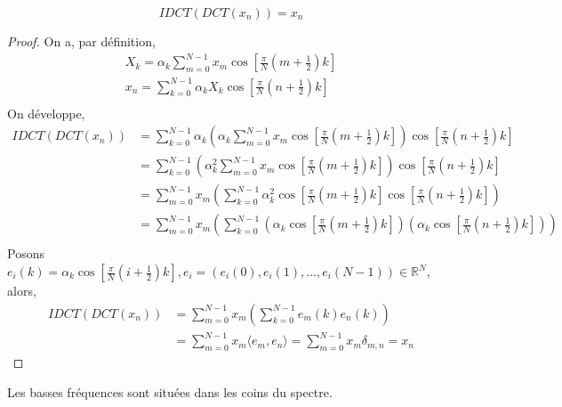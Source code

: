 \label{demo4}
$$IDCT(DCT(x_n)) = x_n$$
\begin{proof}
    On a, par définition,
    \begin{align*}
        X_k = \alpha_k\sum_{m=0}^{N-1}x_m\cos \left[\frac{\pi}{N}\left(m+\frac{1}{2}\right)k\right] \\
        x_n = \sum_{k=0}^{N-1}\alpha_k X_k\cos \left[\frac{\pi}{N}\left(n+\frac{1}{2}\right)k\right]\\
    \end{align*}
    On développe, 
    \begin{align*}
        IDCT(DCT(x_n))&=\sum_{k=0}^{N-1}\alpha_k \left(\alpha_k\sum_{m=0}^{N-1}x_m\cos \left[\frac{\pi}{N}\left(m+\frac{1}{2}\right)k\right]\right)\cos \left[\frac{\pi}{N}\left(n+\frac{1}{2}\right)k\right]\\
        &=\sum_{k=0}^{N-1}\left(\alpha_k^2\sum_{m=0}^{N-1}x_m\cos \left[\frac{\pi}{N}\left(m+\frac{1}{2}\right)k\right]\right)\cos \left[\frac{\pi}{N}\left(n+\frac{1}{2}\right)k\right]\\
        &=\sum_{m=0}^{N-1}x_m\left(\sum_{k=0}^{N-1}\alpha_k^2\cos \left[\frac{\pi}{N}\left(m+\frac{1}{2}\right)k\right]\cos \left[\frac{\pi}{N}\left(n+\frac{1}{2}\right)k\right]\right)\\
        &=\sum_{m=0}^{N-1}x_m\left(\sum_{k=0}^{N-1}\left(\alpha_k\cos \left[\frac{\pi}{N}\left(m+\frac{1}{2}\right)k\right]\right)\left(\alpha_k\cos \left[\frac{\pi}{N}\left(n+\frac{1}{2}\right)k\right]\right)\right) \\
    \end{align*}
    Posons $e_i(k) =\alpha_k\cos\left[\frac{\pi}{N}\left(i+\frac{1}{2}\right)k\right], e_i=(e_i(0),e_i(1), \dots ,e_i(N-1)) \in \mathbb{R}^N$, alors,
    \begin{align*}    
        IDCT(DCT(x_n)) &=\sum_{m=0}^{N-1}x_m\left(\sum_{k=0}^{N-1}e_m(k)e_n(k)\right) \\
        &=\sum_{m=0}^{N-1}x_m\langle e_m,e_n\rangle =\sum_{m=0}^{N-1}x_m\delta_{m,n} = x_n
    \end{align*}
\end{proof}

\pagebreak

\label{demo5}
Les basses fréquences sont situées dans les coins du spectre. 

